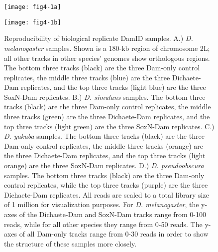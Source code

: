 \begin{figure}[H]
	\centering
	\texttt{[image: fig4-1a]}
	\label{Figure 4.1}
\end{figure}

\begin{figure}[H]
\centering
\texttt{[image: fig4-1b]}
\caption[Reproducibility of biological replicate DamID samples]{Reproducibility of biological replicate DamID samples. A.) \emph{D. melanogaster} samples. Shown is a 180-kb region of chromosome 2L; all other tracks in other species’ genomes show orthologous regions. The bottom three tracks (black) are the three Dam-only control replicates, the middle three tracks (blue) are the three Dichaete-Dam replicates, and the top three tracks (light blue) are the three SoxN-Dam replicates. B.) \emph{D. simulans} samples. The bottom three tracks (black) are the three Dam-only control replicates, the middle three tracks (green) are the three Dichaete-Dam replicates, and the top three tracks (light green) are the three SoxN-Dam replicates. C.) \emph{D. yakuba} samples. The bottom three tracks (black) are the three Dam-only control replicates, the middle three tracks (orange) are the three Dichaete-Dam replicates, and the top three tracks (light orange) are the three SoxN-Dam replicates. D.) \emph{D. pseudoobscura} samples. The bottom three tracks (black) are the three Dam-only control replicates, while the top three tracks (purple) are the three Dichaete-Dam replicates. All reads are scaled to a total library size of 1 million for visualization purposes. For \emph{D. melanogaster}, the y-axes of the Dichaete-Dam and SoxN-Dam tracks range from 0-100 reads, while for all other species they range from 0-50 reads. The y-axes of all Dam-only tracks range from 0-30 reads in order to show the structure of these samples more closely.}
\label{Figure 4.1}
\end{figure}

